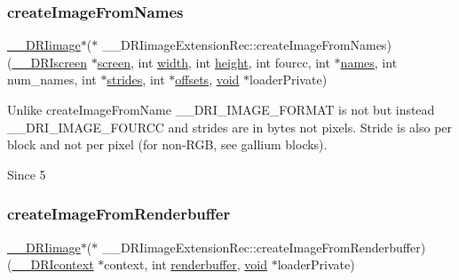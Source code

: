 \mbox{\label{struct_____d_r_iimage_extension_rec_aa99f203a85c969ff1fdd24ed591d23dd}} 
\subsubsection{\texorpdfstring{create\+Image\+From\+Names}{createImageFromNames}}
{\footnotesize\ttfamily \hyperlink{dri__interface_8h_a37e0407153595dc88fe5d25127645cf1}{\+\_\+\+\_\+\+D\+R\+Iimage}$\ast$($\ast$ \+\_\+\+\_\+\+D\+R\+Iimage\+Extension\+Rec\+::create\+Image\+From\+Names) (\hyperlink{dri__interface_8h_a9961b01d421ee1fd6ed3c05acc9ca561}{\+\_\+\+\_\+\+D\+R\+Iscreen} $\ast$\hyperlink{cad_8h_ae04e09e4e3831bfc1632c509ae37dcec}{screen}, int \hyperlink{gl_8h_a9a82cf3caff84cabc4598e2619faac17}{width}, int \hyperlink{gl_8h_aa352f2804b9902ac30769c00dde75d5f}{height}, int fourcc, int $\ast$\hyperlink{glext_8h_a339b9616ddcfbc036f0258f8dcdd8902}{names}, int num\+\_\+names, int $\ast$\hyperlink{glcorearb_8h_abdc1551331dfc83183e1c34542207728}{strides}, int $\ast$\hyperlink{glcorearb_8h_a1b4d6c0d4a1eb8b693aa458f455ed705}{offsets}, \hyperlink{_s_d_l__opengles2__gl2ext_8h_ae5d8fa23ad07c48bb609509eae494c95}{void} $\ast$loader\+Private)}

Unlike create\+Image\+From\+Name \+\_\+\+\_\+\+D\+R\+I\+\_\+\+I\+M\+A\+G\+E\+\_\+\+F\+O\+R\+M\+AT is not but instead \+\_\+\+\_\+\+D\+R\+I\+\_\+\+I\+M\+A\+G\+E\+\_\+\+F\+O\+U\+R\+CC and strides are in bytes not pixels. Stride is also per block and not per pixel (for non-\/\+R\+GB, see gallium blocks).

\begin{DoxySince}{Since}
5 
\end{DoxySince}
\mbox{\label{struct_____d_r_iimage_extension_rec_a4e84cfb8503d08dc5219fa7f1a6edbb6}} 
\subsubsection{\texorpdfstring{create\+Image\+From\+Renderbuffer}{createImageFromRenderbuffer}}
{\footnotesize\ttfamily \hyperlink{dri__interface_8h_a37e0407153595dc88fe5d25127645cf1}{\+\_\+\+\_\+\+D\+R\+Iimage}$\ast$($\ast$ \+\_\+\+\_\+\+D\+R\+Iimage\+Extension\+Rec\+::create\+Image\+From\+Renderbuffer) (\hyperlink{dri__interface_8h_a3fd295cba82b5a3d79f1ee7e12bfb908}{\+\_\+\+\_\+\+D\+R\+Icontext} $\ast$context, int \hyperlink{glcorearb_8h_a2de59ce19521dddd661a02a95abc2764}{renderbuffer}, \hyperlink{_s_d_l__opengles2__gl2ext_8h_ae5d8fa23ad07c48bb609509eae494c95}{void} $\ast$loader\+Private)}

